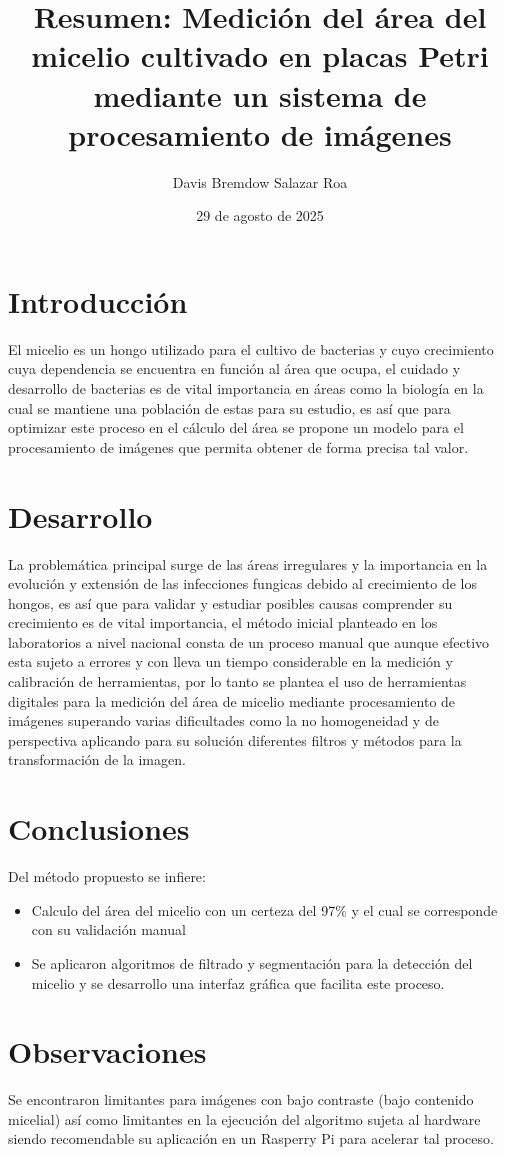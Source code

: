 \documentclass[12pt,a4paper]{article}
\title{Resumen: \textbf{Medición del área del micelio cultivado en placas Petri mediante un sistema de procesamiento de imágenes}}
\author{Davis Bremdow Salazar Roa}
\date{29 de agosto de 2025}
\begin{document}
	
	\maketitle
	
	\section{Introducción}
	El micelio es un hongo utilizado para el cultivo de bacterias y cuyo crecimiento cuya dependencia se encuentra en función al área que ocupa, el cuidado y desarrollo de bacterias es de vital importancia en áreas como la biología en la cual se mantiene una población de estas para su estudio, es así que para optimizar este proceso en el cálculo del área se propone un modelo para el procesamiento de imágenes que permita obtener de forma precisa tal valor.
	
	\section{Desarrollo}
	La problemática principal surge de las áreas irregulares y la importancia en la evolución y extensión de las infecciones fungicas debido al crecimiento de los hongos, es así que para validar y estudiar posibles causas comprender su crecimiento es de vital importancia, el método inicial planteado en los laboratorios a nivel nacional consta de un proceso manual que aunque efectivo esta sujeto a errores y con lleva un tiempo considerable en la medición y calibración de herramientas, por lo tanto se plantea el uso de herramientas digitales para la medición del área de micelio mediante procesamiento de imágenes superando varias dificultades como la no homogeneidad y de perspectiva aplicando para su solución diferentes filtros y métodos para la transformación de la imagen. 
	
	\section{Conclusiones}
	Del método propuesto se infiere:
	\begin{itemize}
		\item Calculo del área del micelio con un certeza del 97\% y el cual se corresponde con su validación manual
		\item Se aplicaron algoritmos de filtrado y segmentación para la detección del micelio y se desarrollo una interfaz gráfica que facilita este proceso.
	\end{itemize}
	
	\section{Observaciones}
	Se encontraron limitantes para imágenes con bajo contraste (bajo contenido micelial) así como limitantes en la ejecución del algoritmo sujeta al hardware siendo recomendable su aplicación en un Rasperry Pi para acelerar tal proceso.
\end{document}
